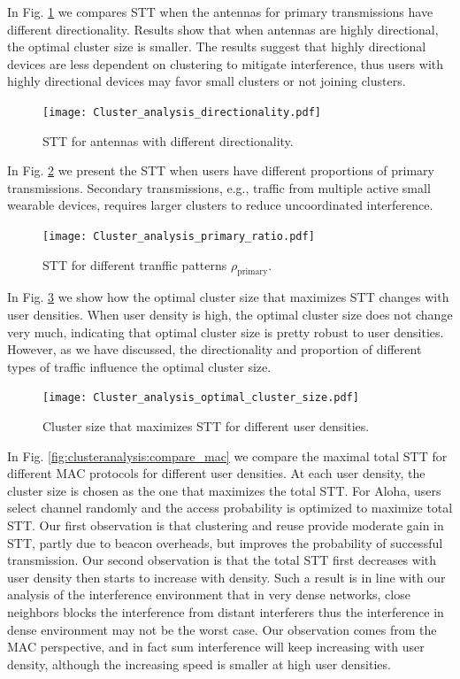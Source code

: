 \documentclass[10pt, conference, letterpaper]{IEEEtran}
\begin{document}
In Fig. \ref{fig:clusteranalysis:directionality} we compares STT when the antennas for primary transmissions have different directionality. Results show that when antennas are highly directional, the optimal cluster size is smaller. The results suggest that highly directional devices are less dependent on clustering to mitigate interference, thus users with highly directional devices may favor small clusters or not joining clusters. 
\begin{figure}
	\centering
	\texttt{[image: Cluster\_analysis\_directionality.pdf]}
	\caption{STT for antennas with different directionality.}
	\label{fig:clusteranalysis:directionality}
\end{figure}

In Fig. \ref{fig:clusteranalysis:primary_ratio} we present the STT when users have different proportions of primary transmissions. Secondary transmissions, e.g., traffic from multiple active small wearable devices, requires larger clusters to reduce uncoordinated interference. 

\begin{figure}
	\centering
	\texttt{[image: Cluster\_analysis\_primary\_ratio.pdf]}
	\caption{STT for different tranffic patterns $\rho_{\mathrm{primary}}$.}
	\label{fig:clusteranalysis:primary_ratio}
\end{figure}

In Fig. \ref{fig:clustereanalysis:optimal_cluster_size} we show how the optimal cluster size that maximizes STT changes with user densities. When user density is high, the optimal cluster size does not change very much, indicating that optimal cluster size is pretty robust to user densities. However, as we have discussed, the directionality and proportion of different types of traffic influence the optimal cluster size. 

\begin{figure}
	\centering
	\texttt{[image: Cluster\_analysis\_optimal\_cluster\_size.pdf]}
	\caption{Cluster size that maximizes STT for different user densities.}
	\label{fig:clustereanalysis:optimal_cluster_size}
\end{figure}

In Fig. \ref{fig:clusteranalysis:compare_mac} we compare the maximal total STT for different MAC protocols for different user densities. At each user density, the cluster size is chosen as the one that maximizes the total STT. For Aloha, users select channel randomly and the access probability is optimized to maximize total STT. Our first observation is that clustering and reuse provide moderate gain in STT, partly due to beacon overheads, but improves the probability of successful transmission. Our second observation is that the total STT first decreases with user density then starts to increase with density. Such a result is in line with our analysis of the interference environment that in very dense networks, close neighbors blocks the interference from distant interferers thus the interference in dense environment may not be the worst case. Our observation comes from the MAC perspective, and in fact sum interference will keep increasing with user density, although the increasing speed is smaller at high user densities. 
\end{document}
